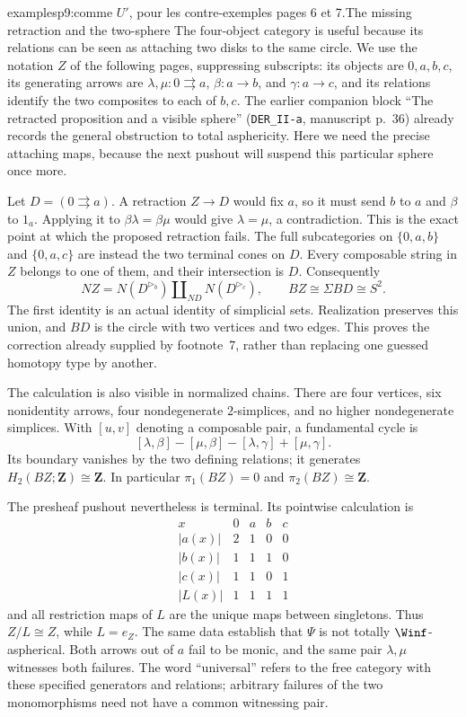 \begin{dcomment}{examples}{p9:comme $U'$, pour les contre-exemples pages 6 et 7.}{The missing retraction and the two-sphere}
The four-object category is useful because its relations can be seen as attaching two disks to the same circle. We use the notation $Z$ of the following pages, suppressing subscripts: its objects are $0,a,b,c$, its generating arrows are $\lambda,\mu:0\rightrightarrows a$, $\beta:a\to b$, and $\gamma:a\to c$, and its relations identify the two composites to each of $b,c$. The earlier companion block ``The retracted proposition and a visible sphere'' (\texttt{DER\_II-a}, manuscript p.~36) already records the general obstruction to total asphericity. Here we need the precise attaching maps, because the next pushout will suspend this particular sphere once more.

Let $D=(0\rightrightarrows a)$. A retraction $Z\to D$ would fix $a$, so it must send $b$ to $a$ and $\beta$ to $1_a$. Applying it to $\beta\lambda=\beta\mu$ would give $\lambda=\mu$, a contradiction. This is the exact point at which the proposed retraction fails. The full subcategories on $\{0,a,b\}$ and $\{0,a,c\}$ are instead the two terminal cones on $D$. Every composable string in $Z$ belongs to one of them, and their intersection is $D$. Consequently
\[
 NZ=N(D^{\triangleright_b})\amalg_{ND}N(D^{\triangleright_c}),
 \qquad BZ\cong\Sigma BD\cong S^2.
\]
The first identity is an actual identity of simplicial sets. Realization preserves this union, and $BD$ is the circle with two vertices and two edges. This proves the correction already supplied by footnote~7, rather than replacing one guessed homotopy type by another.

The calculation is also visible in normalized chains. There are four vertices, six nonidentity arrows, four nondegenerate $2$-simplices, and no higher nondegenerate simplices. With $[u,v]$ denoting a composable pair, a fundamental cycle is
\[
 [\lambda,\beta]-[\mu,\beta]-[\lambda,\gamma]+[\mu,\gamma].
\]
Its boundary vanishes by the two defining relations; it generates $H_2(BZ;\mathbf Z)\cong\mathbf Z$. In particular $\pi_1(BZ)=0$ and $\pi_2(BZ)\cong\mathbf Z$.

The presheaf pushout nevertheless is terminal. Its pointwise calculation is
\[
\begin{array}{c|cccc}
 x&0&a&b&c\\\hline
 |a(x)|&2&1&0&0\\
 |b(x)|&1&1&1&0\\
 |c(x)|&1&1&0&1\\
 |L(x)|&1&1&1&1
\end{array}
\]
and all restriction maps of $L$ are the unique maps between singletons. Thus $Z/L\cong Z$, while $L=e_Z$. The same data establish that $\Psi$ is not totally $\Winf$-aspherical. Both arrows out of $a$ fail to be monic, and the same pair $\lambda,\mu$ witnesses both failures. The word ``universal'' refers to the free category with these specified generators and relations; arbitrary failures of the two monomorphisms need not have a common witnessing pair.
\end{dcomment}


